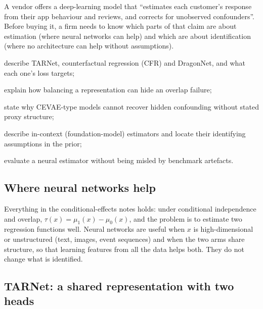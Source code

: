 \documentclass[11pt]{article}
\begin{document}

\begin{decision}
A vendor offers a deep-learning model that ``estimates each customer's response from their app behaviour and
reviews, and corrects for unobserved confounders''. Before buying it, a firm needs to know which parts of that
claim are about estimation (where neural networks can help) and which are about identification (where no
architecture can help without assumptions).
\end{decision}

\begin{goals}
  \item describe TARNet, counterfactual regression (CFR) and DragonNet, and what each one's loss targets;
  \item explain how balancing a representation can hide an overlap failure;
  \item state why CEVAE-type models cannot recover hidden confounding without stated proxy structure;
  \item describe in-context (foundation-model) estimators and locate their identifying assumptions in the prior;
  \item evaluate a neural estimator without being misled by benchmark artefacts.
\end{goals}

\sectionone

\subsection{Where neural networks help}

Everything in the conditional-effects notes holds: under conditional independence and overlap,
$\tau(x) = \mu_1(x) - \mu_0(x)$, and the problem is to estimate two regression functions well. Neural networks are
useful when $x$ is high-dimensional or unstructured (text, images, event sequences) and when the two arms
share structure, so that learning features from all the data helps both. They do not change what is identified.

\subsection{TARNet: a shared representation with two heads}
\end{document}
